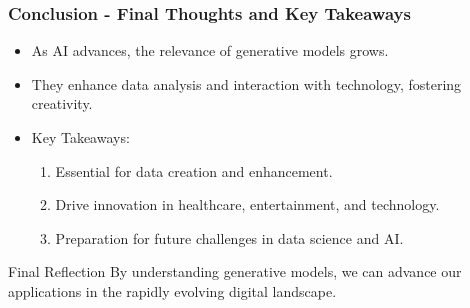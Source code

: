 \documentclass[aspectratio=169]{beamer}
\begin{document}
\begin{frame}[fragile]
    \frametitle{Conclusion - Final Thoughts and Key Takeaways}
    \begin{itemize}
        \item As AI advances, the relevance of generative models grows.
        \item They enhance data analysis and interaction with technology, fostering creativity.
        \item Key Takeaways:
            \begin{enumerate}
                \item Essential for data creation and enhancement.
                \item Drive innovation in healthcare, entertainment, and technology.
                \item Preparation for future challenges in data science and AI.
            \end{enumerate}
    \end{itemize}
    \begin{block}{Final Reflection}
        By understanding generative models, we can advance our applications in the rapidly evolving digital landscape.
    \end{block}
\end{frame}
\end{document}
